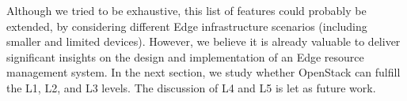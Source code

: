 Although we tried to be exhaustive, this list of features could
probably be extended, \eg by considering different Edge
infrastructure scenarios (\eg including smaller and limited devices).
However, we believe it is already valuable to deliver significant
insights on the design and implementation of an Edge resource management
system. In the next section, we study whether OpenStack can fulfill the L1, L2,
and L3 levels. The discussion of L4 and L5 is let as future work.

